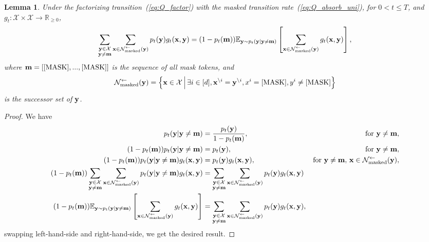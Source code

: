 \documentclass{article} %
\newtheorem{lemma}[theorem]{Lemma}
\def\eqref#1{equation~\ref{#1}}
\newcommand{\bfx}{{\bf x}}
\newcommand{\bfy}{ {\bf y}}
\newcommand{\bfm}{{\bf m}}
\newcommand{\mask}{\text{[MASK]}}
\renewcommand{\eqref}[1]{\textup{(\ref{#1})}}
\newcommand{\Nmasked}{\mathcal{N}^{\leftarrow}_{\text{masked}}}
\begin{document}
\begin{lemma}\label{lemma:relative_matching}
    Under the factorizing transition~\eqref{eq:Q_factor} with the masked transition rate~\eqref{eq:Q_absorb_uni}, for $0<t\leq T$, and $g_t: \mathcal{X} \times \mathcal{X} \to \mathbb{R}_{\geq 0}$,
    \begin{equation}
        \sum_{\substack{\bfy \in \mathcal{X} \\ \bfy \neq \bfm}} \sum_{\substack{\substack{\bfx \in \Nmasked(\bfy)}}} p_t(\bfy) g_t(\bfx, \bfy) = (1-p_t(\bfm)) \mathbb{E}_{\bfy \sim p_t(\bfy|\bfy \neq \bfm)} \left[ \sum_{\substack{\substack{\bfx \in \Nmasked(\bfy)}}} g_t(\bfx, \bfy) \right],
    \end{equation}
    where $\bfm=[\mask,...,\mask]$ is the sequence of all mask tokens, and $$\Nmasked(\bfy)=\left\{ \bfx \in \mathcal{X} \, \middle| \, \exists i \in [d], \bfx^{\backslash i}=\bfy^{\backslash i} , x^i=\mask, y^i \neq \mask \right\}$$ is the successor set of $\bfy$.
\end{lemma}
\begin{proof}
    We have
    \begin{align*}
        p_t(\bfy | \bfy\neq \bfm) &= \frac{p_t(\bfy)}{1-p_t(\bfm)}, \quad &\text{for } \bfy \neq \bfm,\\
        (1-p_t(\bfm)) p_t(\bfy | \bfy\neq \bfm) &= {p_t(\bfy)}, \quad &\text{for } \bfy\neq \bfm,\\
        ({1-p_t(\bfm)}) p_t(\bfy | \bfy\neq \bfm) g_t(\bfx, \bfy) &= p_t(\bfy) g_t(\bfx, \bfy), \quad &\text{for } \bfy \neq \bfm, \, \bfx \in \Nmasked(\bfy),\\
        ({1-p_t(\bfm)}) \sum_{\substack{\bfy \in \mathcal{X} \\ \bfy \neq \bfm}} \sum_{\substack{\substack{\bfx \in \Nmasked(\bfy)}}} p_t(\bfy | \bfy\neq \bfm) g_t(\bfx, \bfy) &= \sum_{\substack{\bfy \in \mathcal{X} \\ \bfy \neq \bfm}} \sum_{\substack{\substack{\bfx \in \Nmasked(\bfy)}}} p_t(\bfy) g_t(\bfx, \bfy) \\
        (1-p_t(\bfm)) \mathbb{E}_{\bfy \sim p_t(\bfy|\bfy \neq \bfm)} \left[ \sum_{\substack{\substack{\bfx \in \Nmasked(\bfy)}}} g_t(\bfx, \bfy)\right] &=\sum_{\substack{\bfy \in \mathcal{X} \\ \bfy \neq \bfm}} \sum_{\substack{\substack{\bfx \in \Nmasked(\bfy)}}} p_t(\bfy) g_t(\bfx, \bfy),
    \end{align*}
    swapping left-hand-side and right-hand-side, we get the desired result.
\end{proof}
\end{document}
